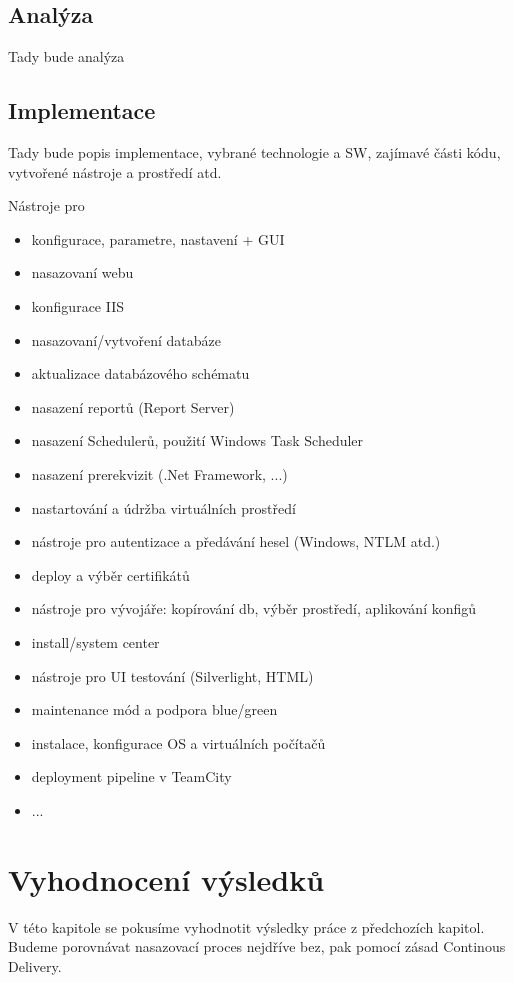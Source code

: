 \section{Analýza}
Tady bude analýza

\section{Implementace}
Tady bude popis implementace, vybrané technologie a SW, zajímavé části kódu, vytvořené nástroje a prostředí atd.

Nástroje pro
\begin{itemize}
  \item konfigurace, parametre, nastavení + GUI
  \item nasazovaní webu
  \item konfigurace IIS
  \item nasazovaní/vytvoření databáze
  \item aktualizace databázového schématu
  \item nasazení reportů (Report Server)
  \item nasazení Schedulerů, použití Windows Task Scheduler
  \item nasazení prerekvizit (.Net Framework, ...)
  \item nastartování a údržba virtuálních prostředí
  \item nástroje pro autentizace a předávání hesel (Windows, NTLM atd.)
  \item deploy a výběr certifikátů
  \item nástroje pro vývojáře: kopírování db, výběr prostředí, aplikování konfigů
  \item install/system center
  \item nástroje pro UI testování (Silverlight, HTML)
  \item maintenance mód a podpora blue/green
  \item instalace, konfigurace OS a virtuálních počítačů
  \item deployment pipeline v TeamCity  
  \item ...
\end{itemize}

\chapter{Vyhodnocení výsledků}
\label{ch:vyslekdy}
V této kapitole se pokusíme vyhodnotit výsledky práce z předchozích kapitol. Budeme porovnávat nasazovací proces nejdříve bez, pak pomocí zásad Continous Delivery. 

